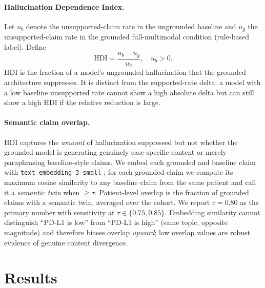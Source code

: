 \documentclass{article}
\theoremstyle{plain}
\begin{document}
\paragraph{Hallucination Dependence Index.} Let $u_b$ denote the unsupported-claim rate in the ungrounded baseline and $u_g$ the unsupported-claim rate in the grounded full-multimodal condition (rule-based label). Define
\begin{equation}
\text{HDI} = \frac{u_b - u_g}{u_b}, \quad u_b > 0.
\label{eq:hdi}
\end{equation}
HDI is the fraction of a model's ungrounded hallucination that the grounded architecture suppresses. It is distinct from the supported-rate delta: a model with a low baseline unsupported rate cannot show a high absolute delta but can still show a high HDI if the relative reduction is large.

\paragraph{Semantic claim overlap.} HDI captures the \emph{amount} of hallucination suppressed but not whether the grounded model is generating genuinely case-specific content or merely paraphrasing baseline-style claims. We embed each grounded and baseline claim with \texttt{text-embedding-3-small} \citep{openai2024embeddings}; for each grounded claim we compute its maximum cosine similarity to any baseline claim from the same patient and call it a \emph{semantic twin} when $\geq \tau$. Patient-level overlap is the fraction of grounded claims with a semantic twin, averaged over the cohort. We report $\tau{=}0.80$ as the primary number with sensitivity at $\tau\in\{0.75, 0.85\}$. Embedding similarity cannot distinguish ``PD-L1 is low'' from ``PD-L1 is high'' (same topic, opposite magnitude) and therefore biases overlap \emph{upward}; low overlap values are robust evidence of genuine content divergence.

\section{Results}
\label{sec:results}
\end{document}
